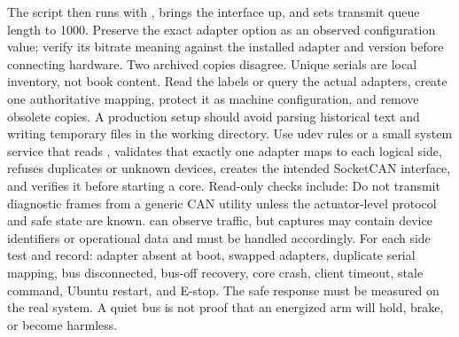 {}The script then runs  with , brings the interface up, and sets transmit queue length to 1000. Preserve the exact adapter option as an observed configuration value; verify its bitrate meaning against the installed adapter and  version before connecting hardware.\markdownRendererParagraphSeparator
{}Two archived  copies disagree. Unique serials are local inventory, not book content. Read the labels or query the actual adapters, create one authoritative mapping, protect it as machine configuration, and remove obsolete copies.\markdownRendererInterblockSeparator
{}\markdownRendererSectionBegin
{}\markdownRendererInterblockSeparator
{}A production setup should avoid parsing historical  text and writing temporary files in the working directory. Use udev rules or a small system service that reads , validates that exactly one adapter maps to each logical side, refuses duplicates or unknown devices, creates the intended SocketCAN interface, and verifies it before starting a core.\markdownRendererParagraphSeparator
{}Read-only checks include:\markdownRendererInterblockSeparator
{}\markdownRendererInterblockSeparator
{}Do not transmit diagnostic frames from a generic CAN utility unless the actuator-level protocol and safe state are known.  can observe traffic, but captures may contain device identifiers or operational data and must be handled accordingly.\markdownRendererInterblockSeparator
{}
\markdownRendererSectionEnd \markdownRendererSectionBegin
{}\markdownRendererInterblockSeparator
{}For each side test and record: adapter absent at boot, swapped adapters, duplicate serial mapping, bus disconnected, bus-off recovery, core crash, client timeout, stale command, Ubuntu restart, and E-stop. The safe response must be measured on the real system. A quiet bus is not proof that an energized arm will hold, brake, or become harmless.\markdownRendererInterblockSeparator
{}
\markdownRendererSectionEnd 
\markdownRendererSectionEnd \markdownRendererSectionBegin
{}\markdownRendererInterblockSeparator
